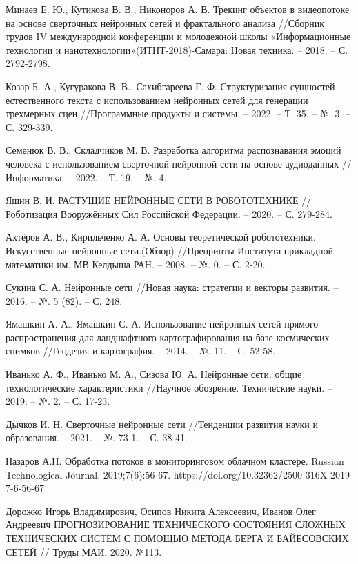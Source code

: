 \documentclass{article}
\begin{document}
\begin{thebibliography}{}
		 Минаев Е. Ю., Кутикова В. В., Никоноров А. В. Трекинг объектов в видеопотоке на основе сверточных нейронных сетей и фрактального анализа //Сборник трудов IV международной конференции и молодежной школы «Информационные технологии и нанотехнологии»(ИТНТ-2018)-Самара: Новая техника. – 2018. – С. 2792-2798.
		
		 Козар Б. А., Кугуракова В. В., Сахибгареева Г. Ф. Структуризация сущностей естественного текста с использованием нейронных сетей для генерации трехмерных сцен //Программные продукты и системы. – 2022. – Т. 35. – №. 3. – С. 329-339.
		
		 Семенюк В. В., Складчиков М. В. Разработка алгоритма распознавания эмоций человека с использованием сверточной нейронной сети на основе аудиоданных //Информатика. – 2022. – Т. 19. – №. 4.
		
		 Яшин В. И. РАСТУЩИЕ НЕЙРОННЫЕ СЕТИ В РОБОТОТЕХНИКЕ //Роботизация Вооружённых Сил Российской Федерации. – 2020. – С. 279-284.
		
		 Ахтёров А. В., Кирильченко А. А. Основы теоретической робототехники. Искусственные нейронные сети.(Обзор) //Препринты Института прикладной математики им. МВ Келдыша РАН. – 2008. – №. 0. – С. 2-20.
		
		 Сукина С. А. Нейронные сети //Новая наука: стратегии и векторы развития. – 2016. – №. 5 (82). – С. 248.
		
		 Ямашкин А. А., Ямашкин С. А. Использование нейронных сетей прямого распространения для ландшафтного картографирования на базе космических снимков //Геодезия и картография. – 2014. – №. 11. – С. 52-58.
		
		 Иванько А. Ф., Иванько М. А., Сизова Ю. А. Нейронные сети: общие технологические характеристики //Научное обозрение. Технические науки. – 2019. – №. 2. – С. 17-23.
		
		 Дычков И. Н. Сверточные нейронные сети //Тенденции развития науки и образования. – 2021. – №. 73-1. – С. 38-41.
		
		 Назаров А.Н. Обработка потоков в мониторинговом облачном кластере. Russian Technological Journal. 2019;7(6):56-67. https://doi.org/10.32362/2500-316X-2019-7-6-56-67
		
		 Дорожко Игорь Владимирович, Осипов Никита Алексеевич, Иванов Олег Андреевич ПРОГНОЗИРОВАНИЕ ТЕХНИЧЕСКОГО СОСТОЯНИЯ СЛОЖНЫХ ТЕХНИЧЕСКИХ СИСТЕМ С ПОМОЩЬЮ МЕТОДА БЕРГА И БАЙЕСОВСКИХ СЕТЕЙ // Труды МАИ. 2020. №113.
		

\end{thebibliography}
\end{document}

